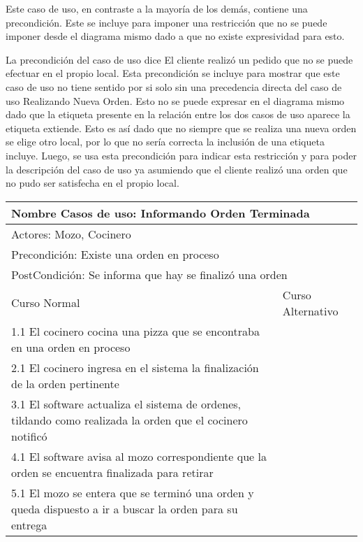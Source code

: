 \documentclass[a4paper,10pt]{article}
\begin{document}
Este caso de uso, en contraste a la mayor\'ia de los dem\'as, contiene una precondici\'on. Este se incluye para imponer una restricci\'on que no
se puede imponer desde el diagrama mismo dado a que no existe expresividad para esto. 

La precondici\'on del caso de uso dice El cliente realiz\'o un pedido que no se puede efectuar en el propio local.
Esta precondici\'on se incluye para mostrar que este caso de uso no tiene sentido por si solo sin una precedencia directa del caso de uso
Realizando Nueva Orden. Esto no se puede expresar en el diagrama mismo dado que la etiqueta presente en la relaci\'on entre los dos casos de uso 
aparece la etiqueta extiende. Esto es as\'i dado que no siempre que se realiza una nueva orden se elige otro local, por lo que no ser\'ia correcta
la inclusi\'on de una etiqueta incluye. Luego, se usa esta precondici\'on para indicar esta restricci\'on y para poder la descripci\'on del caso de uso
ya asumiendo que el cliente realiz\'o una orden que no pudo ser satisfecha en el propio local.

\bigskip

\begin{center}
\begin{tabularx}{14cm}{|X|X|}
\hline
\multicolumn{2}{|l|}{Nombre Casos de uso: Informando Orden Terminada}\\
\hline
\multicolumn{2}{|l|}{Actores: Mozo, Cocinero}\\
\hline
\multicolumn{2}{|l|}{Precondici\'on: Existe una orden en proceso}\\
\hline
\multicolumn{2}{|l|}{PostCondici\'on: Se informa que hay se finaliz\'o una orden}\\
\hline
Curso Normal & Curso Alternativo\\
\hline
1.1 El cocinero cocina una pizza que se encontraba en una orden en proceso & 
\\
\hline
2.1 El cocinero ingresa en el sistema la finalizaci\'on de la orden pertinente & 
\\
\hline
3.1 El software actualiza el sistema de ordenes, tildando como realizada la orden que el cocinero notific\'o &
\\
\hline
4.1 El software avisa al mozo correspondiente que la orden se encuentra finalizada para retirar &
\\
\hline
5.1 El mozo se entera que se termin\'o una orden y queda dispuesto a ir a buscar la orden para su entrega &
\\
\hline
\end{tabularx}
\end{center}
\end{document}
